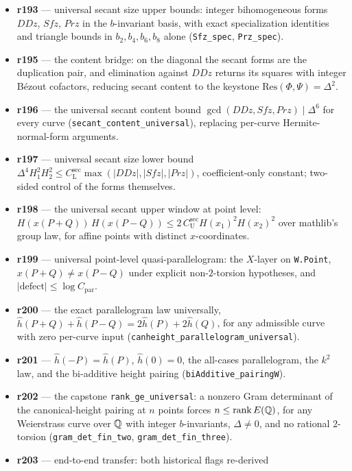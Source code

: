 \begin{itemize}
\item \textbf{r193} --- universal secant size upper bounds: integer
bihomogeneous forms $DDz$, $Sfz$, $Prz$ in the $b$-invariant basis, with exact
specialization identities and triangle bounds in $b_2,b_4,b_6,b_8$ alone
(\texttt{Sfz\_spec}, \texttt{Prz\_spec}).
\item \textbf{r195} --- the content bridge: on the diagonal the secant forms
are the duplication pair, and elimination against $DDz$ returns its squares
with integer B\'ezout cofactors, reducing secant content to the keystone
$\mathrm{Res}(\Phi,\Psi)=\Delta^2$.
\item \textbf{r196} --- the universal secant content bound
$\gcd(DDz,Sfz,Prz) \mid \Delta^6$ for every curve
(\texttt{secant\_content\_universal}), replacing per-curve Hermite-normal-form
arguments.
\item \textbf{r197} --- universal secant size lower bound
$\Delta^4 H_1^2H_2^2 \le C_{\mathrm{L}}^{\mathrm{sec}}\max(|DDz|,|Sfz|,|Prz|)$,
coefficient-only constant; two-sided control of the forms themselves.
\item \textbf{r198} --- the universal secant upper window at point level:
$H(x(P{+}Q))\,H(x(P{-}Q)) \le 2\,C_{\mathrm{U}}^{\mathrm{sec}}H(x_1)^2H(x_2)^2$
over mathlib's group law, for affine points with distinct $x$-coordinates.
\item \textbf{r199} --- universal point-level quasi-parallelogram: the $X$-layer
on \texttt{W.Point}, $x(P{+}Q)\ne x(P{-}Q)$ under explicit non-$2$-torsion
hypotheses, and $|\text{defect}| \le \log C_{\mathrm{par}}$.
\item \textbf{r200} --- the exact parallelogram law universally,
$\hat{h}(P{+}Q)+\hat{h}(P{-}Q)=2\hat{h}(P)+2\hat{h}(Q)$, for any admissible
curve with zero per-curve input
(\texttt{canheight\_parallelogram\_universal}).
\item \textbf{r201} --- $\hat{h}(-P)=\hat{h}(P)$, $\hat{h}(0)=0$, the
all-cases parallelogram, the $k^2$ law, and the bi-additive height pairing
(\texttt{biAdditive\_pairingW}).
\item \textbf{r202} --- the capstone \texttt{rank\_ge\_universal}: a nonzero
Gram determinant of the canonical-height pairing at $n$ points forces
$n \le \operatorname{rank} E(\mathbb{Q})$, for any Weierstrass curve over $\mathbb{Q}$ with integer
$b$-invariants, $\Delta \ne 0$, and no rational $2$-torsion
(\texttt{gram\_det\_fin\_two}, \texttt{gram\_det\_fin\_three}).
\item \textbf{r203} --- end-to-end transfer: both historical flags re-derived

\end{itemize}

